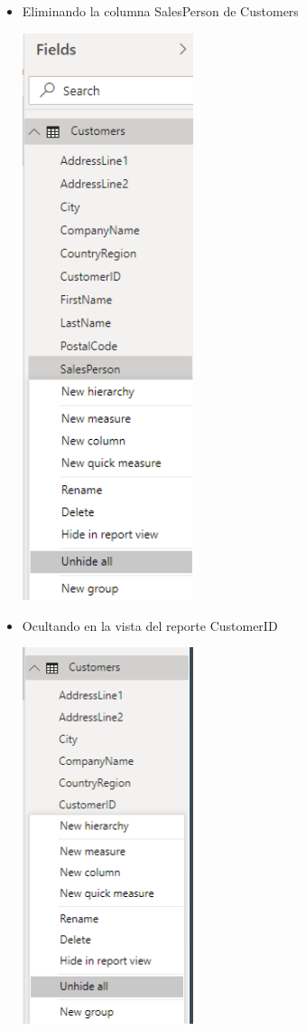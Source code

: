 \begin{itemize}
	\item Eliminando la columna SalesPerson de Customers
	\begin{center}
	\includegraphics[width=5cm]{./Imagenes/Captura2-3} 
	\end{center}
\end{itemize} 

\begin{itemize}
	\item Ocultando en la vista del reporte CustomerID
	\begin{center}
	\includegraphics[width=5cm]{./Imagenes/Captura2-4} 
	\end{center}
\end{itemize} 

